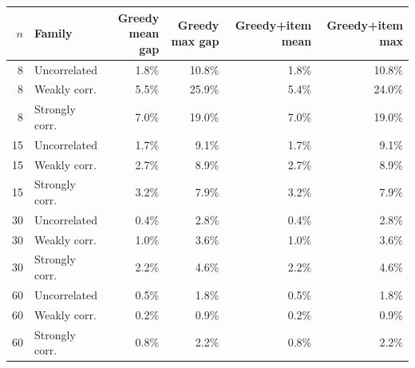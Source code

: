 \begin{tabular}{@{}r l r r r r@{}}
\toprule
$n$ & Family & Greedy mean gap & Greedy max gap & Greedy+item mean & Greedy+item max\\
\midrule
8 & Uncorrelated & 1.8\% & 10.8\% & 1.8\% & 10.8\%\\
8 & Weakly corr. & 5.5\% & 25.9\% & 5.4\% & 24.0\%\\
8 & Strongly corr. & 7.0\% & 19.0\% & 7.0\% & 19.0\%\\
\midrule
15 & Uncorrelated & 1.7\% & 9.1\% & 1.7\% & 9.1\%\\
15 & Weakly corr. & 2.7\% & 8.9\% & 2.7\% & 8.9\%\\
15 & Strongly corr. & 3.2\% & 7.9\% & 3.2\% & 7.9\%\\
\midrule
30 & Uncorrelated & 0.4\% & 2.8\% & 0.4\% & 2.8\%\\
30 & Weakly corr. & 1.0\% & 3.6\% & 1.0\% & 3.6\%\\
30 & Strongly corr. & 2.2\% & 4.6\% & 2.2\% & 4.6\%\\
\midrule
60 & Uncorrelated & 0.5\% & 1.8\% & 0.5\% & 1.8\%\\
60 & Weakly corr. & 0.2\% & 0.9\% & 0.2\% & 0.9\%\\
60 & Strongly corr. & 0.8\% & 2.2\% & 0.8\% & 2.2\%\\
\bottomrule
\end{tabular}
